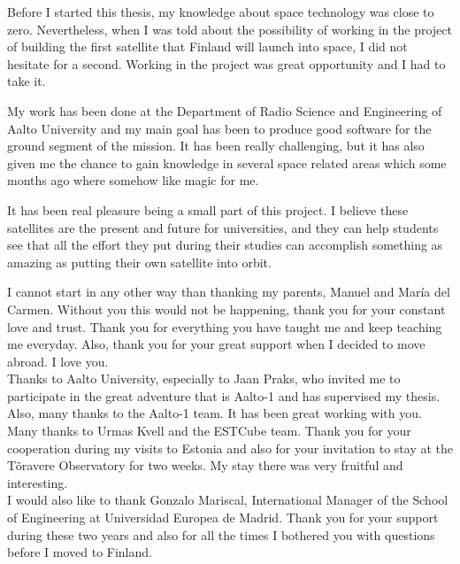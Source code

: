 
Before I started this thesis, my knowledge about space technology was close to zero. Nevertheless, when I was told about the possibility of working in the project of building the first satellite that Finland will launch into space, I did not hesitate for a second. Working in the project was great opportunity and I had to take it.

My work has been done at the Department of Radio Science and Engineering of Aalto University and my main goal has been to produce good software for the ground segment of the mission. It has been really challenging, but it has also given me the chance to gain knowledge in several space related areas which some months ago where somehow like magic for me.

It has been real pleasure being a small part of this project. I believe these satellites are the present and future for universities, and they can help students see that all the effort they put during their studies can accomplish something as amazing as putting their own satellite into orbit.


\thispagestyle{plain}
\pagebreak


I cannot start in any other way than thanking my parents, Manuel and María del Carmen. Without you this would not be happening, thank you for your constant love and trust. Thank you for everything you have taught me and keep teaching me everyday. Also, thank you for your great support when I decided to move abroad. I love you.\\

Thanks to Aalto University, especially to Jaan Praks, who invited me to participate in the great adventure that is Aalto-1 and has supervised my thesis. Also, many thanks to the Aalto-1 team. It has been great working with you.\\

Many thanks to Urmas Kvell and the ESTCube team. Thank you for your cooperation during my visits to Estonia and also for your invitation to stay at the Tõravere Observatory for two weeks. My stay there was very fruitful  and interesting.\\

I would also like to thank Gonzalo Mariscal, International Manager of the School of Engineering at Universidad Europea de Madrid. Thank you for your support during these two years and also for all the times I bothered you with questions before I moved to Finland.\\

